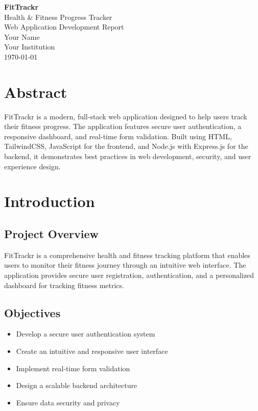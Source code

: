 \documentclass[12pt,a4paper]{article}
\begin{document}
\begin{titlepage}
    \centering
    \vspace*{\fill}
    
    {\Huge \textbf{FitTrackr}}\\[0.5cm]
    {\Large Health \& Fitness Progress Tracker}\\[0.3cm]
    {\large Web Application Development Report}\\[2cm]
    
    {\large Your Name}\\[0.2cm]
    {\large Your Institution}\\[0.5cm]
    {\large \today}
    
    \vspace*{\fill}
\end{titlepage}
\thispagestyle{empty}

\tableofcontents
\newpage

\section{Abstract}
FitTrackr is a modern, full-stack web application designed to help users track their fitness progress. The application features secure user authentication, a responsive dashboard, and real-time form validation. Built using HTML, TailwindCSS, JavaScript for the frontend, and Node.js with Express.js for the backend, it demonstrates best practices in web development, security, and user experience design.

\section{Introduction}

\subsection{Project Overview}
FitTrackr is a comprehensive health and fitness tracking platform that enables users to monitor their fitness journey through an intuitive web interface. The application provides secure user registration, authentication, and a personalized dashboard for tracking fitness metrics.

\subsection{Objectives}
\begin{itemize}
    \item Develop a secure user authentication system
    \item Create an intuitive and responsive user interface
    \item Implement real-time form validation
    \item Design a scalable backend architecture
    \item Ensure data security and privacy
\end{itemize}
\end{document}
